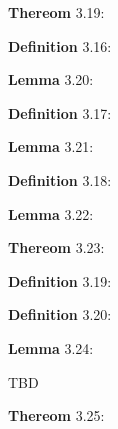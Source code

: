 \documentclass{article}
\begin{document}
\par 
\textbf{Thereom} 3.19:
\newline


\par 
\textbf{Definition} 3.16:
\newline

\par 
\textbf{Lemma} 3.20:
\newline

\par 
\textbf{Definition} 3.17:
\newline

\par 
\textbf{Lemma} 3.21:
\newline


\par 
\textbf{Definition} 3.18:
\newline

\par 
\textbf{Lemma} 3.22:
\newline

\par 
\textbf{Thereom} 3.23:
\newline

\par 
\textbf{Definition} 3.19:
\newline

\par 
\textbf{Definition} 3.20:
\newline

\par 
\textbf{Lemma} 3.24:
\newline

TBD

\par 
\textbf{Thereom} 3.25:
\newline
\end{document}
